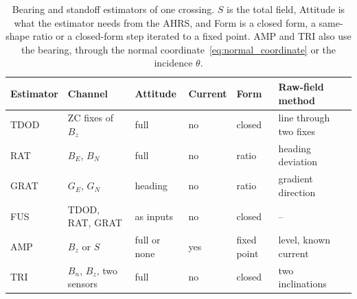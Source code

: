 \begin{table}[htb]
\centering
\small
\caption{Bearing and standoff estimators of one crossing. $S$ is the total field, Attitude is what the estimator needs from the AHRS, and Form is a closed form, a same-shape ratio or a closed-form step iterated to a fixed point. AMP and TRI also use the bearing, through the normal coordinate~\eqref{eq:normal_coordinate} or the incidence $\theta$.}
\label{tab:observers}
\begin{tabular}{@{}llllll@{}}
\toprule
Estimator & Channel & Attitude & Current & Form & Raw-field method \\
\midrule
TDOD & ZC fixes of $B_z$ & full & no & closed & line through two fixes~\cite{bharti2020semi} \\
RAT & $B_E$, $B_N$ & full & no & ratio & heading deviation~\cite{xiang2016subsea} \\
GRAT & $G_E$, $G_N$ & heading & no & ratio & gradient direction~\cite{kdd1998maritime} \\
FUS & TDOD, RAT, GRAT & as inputs & no & closed & -- \\
\midrule
AMP & $B_z$ or $S$ & full or none & yes & fixed point & level, known current~\cite{kdd1998maritime} \\
TRI & $B_n$, $B_z$, two sensors & full & no & closed & two inclinations~\cite{xiang2016subsea} \\
\bottomrule
\end{tabular}
\end{table}






